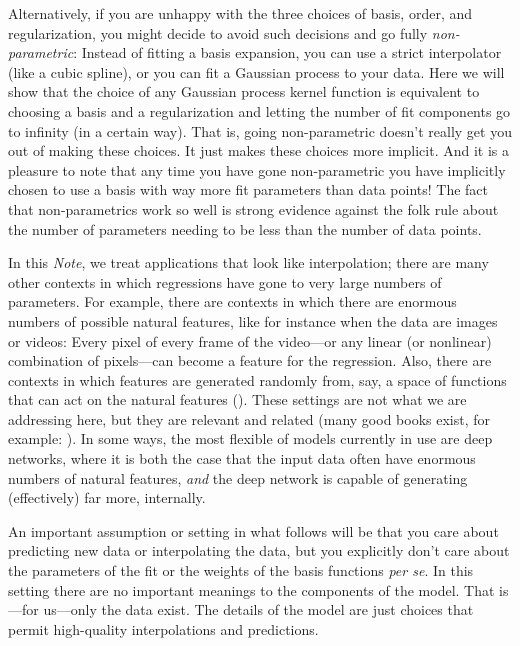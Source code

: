 \documentclass[12pt,letterpaper]{article}
\newcommand{\documentname}{\textsl{Note}}
\newcommand{\foreign}[1]{\textsl{#1}}
\begin{document}
Alternatively, if you are unhappy with the three choices of basis, order, and regularization, you might decide to avoid such decisions and go fully \emph{non-parametric}:
Instead of fitting a basis expansion, you can use a strict interpolator (like a cubic spline), or you can fit a Gaussian process to your data.
Here we will show that the choice of any Gaussian process kernel function is equivalent to choosing a basis and a regularization and letting the number of fit components go to infinity (in a certain way).
That is, going non-parametric doesn't really get you out of making these choices.
It just makes these choices more implicit.
And it is a pleasure to note that any time you have gone non-parametric you have implicitly chosen to use a basis with way more fit parameters than data points!
The fact that non-parametrics work so well is strong evidence against the folk rule about the number of parameters needing to be less than the number of data points.

In this \documentname, we treat applications that look like interpolation; there are many other contexts in which regressions have gone to very large numbers of parameters.
For example, there are contexts in which there are enormous numbers of possible natural features, like for instance when the data are images or videos: Every pixel of every frame of the video---or any linear (or nonlinear) combination of pixels---can become a feature for the regression.
Also, there are contexts in which features are generated randomly from, say, a space of functions that can act on the natural features (\citealt{rahimi2007random}).
These settings are not what we are addressing here, but they are relevant and related
(many good books exist, for example: \citealt{bishop, esl, agresti, gelman}).
In some ways, the most flexible of models currently in use are deep networks, where it is both the case that the input data often have enormous numbers of natural features, \emph{and} the deep network is capable of generating (effectively) far more, internally.

An important assumption or setting in what follows will be that you care about predicting new data or interpolating the data, but you explicitly don't care about the parameters of the fit or the weights of the basis functions \foreign{per se}.
In this setting there are no important meanings to the components of the model.
That is---for us---only the data exist.
The details of the model are just choices that permit high-quality interpolations and predictions.
\end{document}
